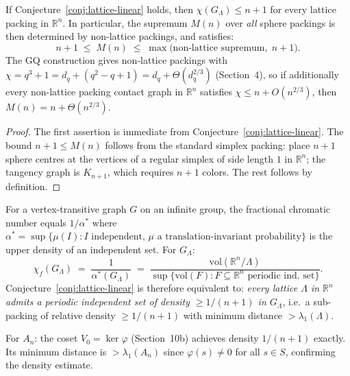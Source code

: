 \begin{proposition}\label{prop:lattice-linear-consequence}
If Conjecture~\ref{conj:lattice-linear} holds, then $\chi(G_\Lambda) \le n+1$ for every lattice packing in $\mathbb{R}^n$.  In particular, the supremum $M(n)$ over \emph{all} sphere packings is then determined by non-lattice packings, and satisfies:
\[
  n + 1 \;\le\; M(n) \;\le\; \max\bigl(\text{non-lattice supremum},\; n+1\bigr).
\]
The GQ construction gives non-lattice packings with $\chi = q^3+1 = d_q + (q^2-q+1) = d_q + \Theta(d_q^{2/3})$ (Section~4), so if additionally every non-lattice packing contact graph in $\mathbb{R}^n$ satisfies $\chi \le n + O(n^{2/3})$, then $M(n) = n + \Theta(n^{2/3})$.
\end{proposition}

\begin{proof}
The first assertion is immediate from Conjecture~\ref{conj:lattice-linear}.  The bound $n+1 \le M(n)$ follows from the standard simplex packing: place $n+1$ sphere centres at the vertices of a regular simplex of side length $1$ in $\mathbb{R}^n$; the tangency graph is $K_{n+1}$, which requires $n+1$ colors.  The rest follows by definition.
\end{proof}

\begin{remark}\label{rem:indep-density}
For a vertex-transitive graph $G$ on an infinite group, the fractional chromatic number equals $1/\alpha^*$ where $\alpha^* = \sup\{\mu(I) : I \text{ independent, } \mu \text{ a translation-invariant probability}\}$ is the upper density of an independent set.  For $G_\Lambda$:
\[
  \chi_f(G_\Lambda) \;=\; \frac{1}{\alpha^*(G_\Lambda)} \;=\; \frac{\mathrm{vol}(\mathbb{R}^n / \Lambda)}{\sup\{\mathrm{vol}(F) : F \subseteq \mathbb{R}^n \text{ periodic ind.\ set}\}}.
\]
Conjecture~\ref{conj:lattice-linear} is therefore equivalent to: \emph{every lattice $\Lambda$ in $\mathbb{R}^n$ admits a periodic independent set of density $\ge 1/(n+1)$ in $G_\Lambda$}, i.e.\ a sub-packing of relative density $\ge 1/(n+1)$ with minimum distance $> \lambda_1(\Lambda)$.

For $A_n$: the coset $V_0 = \ker\varphi$ (Section~10b) achieves density $1/(n+1)$ exactly. Its minimum distance is $> \lambda_1(A_n)$ since $\varphi(s) \neq 0$ for all $s \in S$, confirming the density estimate.
\end{remark}

